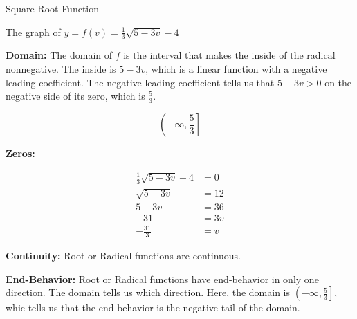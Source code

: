 \documentclass{ximera}
\begin{document}
\begin{example} Square Root Function

The graph of $y = f(v) = \frac{1}{3} \sqrt{5-3v}-4$


\begin{image}
\end{image}

\textbf{Domain:} The domain of $f$ is the interval that makes the inside of the radical nonnegative.  The inside is $5-3v$, which is a linear function with a negative leading coefficient. The negative leading coefficient tells us that $5-3v > 0$ on the negative side of its zero, which is $\frac{5}{3}$.

\[ \left(-\infty, \frac{5}{3} \right] \]

\textbf{Zeros:}


\begin{align*}
\frac{1}{3} \sqrt{5-3v}-4 & = 0   \\
\sqrt{5-3v}               & = 12  \\
5-3v                      & = 36  \\
-31 &= 3v   \\
-\frac{31}{3}   &= v
\end{align*}


\textbf{Continuity:} Root or Radical functions are continuous.


\textbf{End-Behavior:} Root or Radical functions have end-behavior in only one direction. The domain tells us which direction.  Here, the domain is $\left(-\infty, \frac{5}{3} \right]$, whic tells us that the end-behavior is the negative tail of the domain.


\end{example}
\end{document}
